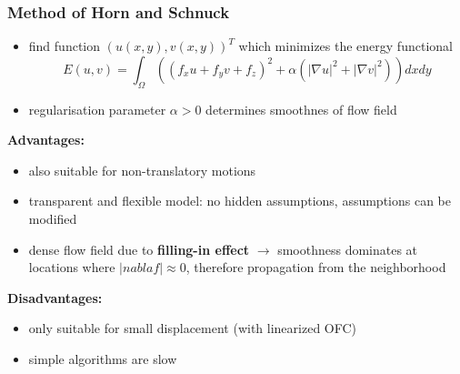 \documentclass[11pt]{article}
\begin{document}
\subsubsection{Method of Horn and Schnuck}
\label{sec-5-1-1}
\begin{itemize}
\item find function $(u(x,y),v(x,y))^T$ which minimizes the energy functional
      \[ E(u,v) = \int_\Omega ((f_xu+f_yv+f_z)^2 + \alpha (|\nabla u|^2 + |\nabla v|^2)) dx dy \]
\item regularisation parameter $\alpha > 0$ determines smoothnes of flow field
\end{itemize}
\textbf{Advantages:}
\begin{itemize}
\item also suitable for non-translatory motions
\item transparent and flexible model: no hidden assumptions, assumptions can be modified
\item dense flow field due to \textbf{filling-in effect} $\rightarrow$ smoothness dominates at
locations where $|nabla f| \approx 0$, therefore propagation from the neighborhood
\end{itemize}
\textbf{Disadvantages:}
\begin{itemize}
\item only suitable for small displacement (with linearized OFC)
\item simple algorithms are slow
\end{itemize}
\end{document}
